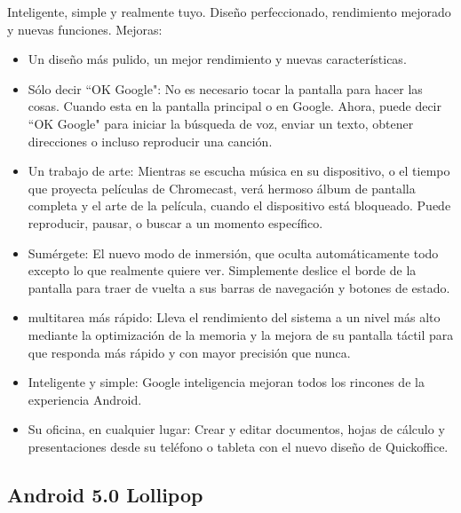 \documentclass[letterpaper,12pt,openany,oneside]{book}
\begin{document}
Inteligente, simple y realmente tuyo. Diseño perfeccionado, rendimiento mejorado y nuevas funciones.
Mejoras:
\flushleft
\begin{itemize}

 \item Un diseño más pulido, un mejor rendimiento y nuevas características.
 \item Sólo decir ``OK Google": No es necesario tocar la pantalla para hacer las cosas. Cuando esta en la pantalla principal o en Google.  Ahora, puede decir ``OK Google" para iniciar la búsqueda de voz, enviar un texto, obtener direcciones o incluso reproducir una canción.
 \item Un trabajo de arte: Mientras se escucha música en su dispositivo, o el tiempo que proyecta películas de Chromecast, verá hermoso álbum de pantalla completa y el arte de la película, cuando el dispositivo está bloqueado. Puede reproducir, pausar, o buscar a un momento específico.
 \item Sumérgete: El nuevo modo de inmersión, que oculta automáticamente todo excepto lo que realmente quiere ver. Simplemente deslice el borde de la pantalla para traer de vuelta a sus barras de navegación y botones de estado.
 \item multitarea más rápido: Lleva el rendimiento del sistema a un nivel más alto mediante la optimización de la memoria y la mejora de su pantalla táctil para que responda más rápido y con mayor precisión que nunca.
 \item Inteligente y simple: Google inteligencia mejoran todos los rincones de la experiencia Android.
 \item Su oficina, en cualquier lugar: Crear y editar documentos, hojas de cálculo y presentaciones desde su teléfono o tableta con el nuevo diseño de Quickoffice.

\end{itemize}

\subsection{Android 5.0 Lollipop}
\end{document}
